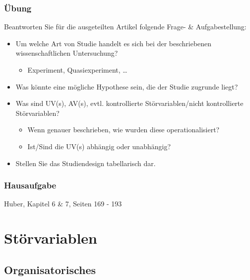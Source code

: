 \documentclass[
]{book}
\providecommand{\tightlist}{%
  \setlength{\itemsep}{0pt}\setlength{\parskip}{0pt}}
\begin{document}
\hypertarget{uxfcbung-1}{%
\subsection{Übung}\label{uxfcbung-1}}

Beantworten Sie für die ausgeteilten Artikel folgende Frage- \& Aufgabestellung:

\begin{itemize}
\tightlist
\item
  Um welche Art von Studie handelt es sich bei der beschriebenen wissenschaftlichen Untersuchung?

  \begin{itemize}
  \tightlist
  \item
    Experiment, Quasiexperiment, \ldots{}
  \end{itemize}
\item
  Was könnte eine mögliche Hypothese sein, die der Studie zugrunde liegt?
\item
  Was sind UV(s), AV(s), evtl. kontrollierte Störvariablen/nicht kontrollierte Störvariablen?

  \begin{itemize}
  \tightlist
  \item
    Wenn genauer beschrieben, wie wurden diese operationalisiert?
  \item
    Ist/Sind die UV(s) abhängig oder unabhängig?
  \end{itemize}
\item
  Stellen Sie das Studiendesign tabellarisch dar.
\end{itemize}

\hypertarget{hausaufgabe-1}{%
\subsection{Hausaufgabe}\label{hausaufgabe-1}}

Huber, Kapitel 6 \& 7, Seiten 169 - 193

\hypertarget{stuxf6rvariablen}{%
\chapter{Störvariablen}\label{stuxf6rvariablen}}

\hypertarget{organisatorisches-6}{%
\section{Organisatorisches}\label{organisatorisches-6}}
\end{document}
